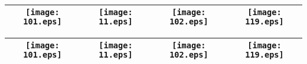\begin{table}[ht!]
\begin{tabular}{ccccc}
\toprule
\multicolumn{2}{c}{\texttt{[image: 101.eps]}} & \texttt{[image: 11.eps]} & \texttt{[image: 102.eps]} & \texttt{[image: 119.eps]}\\
\bottomrule
\end{tabular}
\graphicspath{{../../IbexJobs/ibex_lambdas_20191109/Simulations/Simulation_20180302_\arabic{j}/}}
\begin{tabular}{ccccc}
\toprule
\multicolumn{2}{c}{\texttt{[image: 101.eps]}} & \texttt{[image: 11.eps]} & \texttt{[image: 102.eps]} & \texttt{[image: 119.eps]}\\
\bottomrule
\end{tabular}
\end{table}